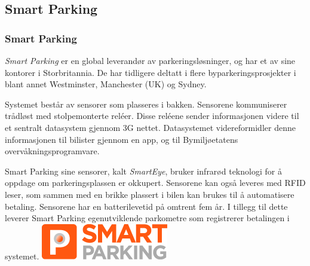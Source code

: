 \documentclass[xetex]{beamer}
\begin{document}
\begin{frame}\label{fr:smart_parking}
	\subsection{Smart Parking}
	\frametitle{\alert{Smart Parking}}
	\emph{Smart Parking} er en global leverandør av parkeringsløsninger, og har et av sine \alert{kontorer i Storbritannia}. De har tidligere deltatt i flere byparkeringsprosjekter i blant annet \alert{Westminster}, \alert{Manchester} (UK) og \alert{Sydney}.
	
	Systemet består av \alert{sensorer} som plasseres i bakken. Sensorene kommuniserer trådløst med stolpemonterte \alert{reléer}. Disse reléene sender informasjonen videre til et sentralt datasystem gjennom \alert{3G} nettet. Datasystemet videreformidler denne informasjonen til bilister gjennom en \alert{app}, og til Bymiljøetatens \alert{overvåkningsprogramvare}.
	
	Smart Parking sine sensorer, kalt \emph{SmartEye}, bruker \alert{infrarød} teknologi for å oppdage om parkeringsplassen er okkupert. Sensorene kan også leveres med \alert{RFID leser}, som sammen med en brikke plassert i bilen kan brukes til å automatisere betaling. Sensorene har en batterilevetid på omtrent \alert{fem år}. I tillegg til dette leverer Smart Parking egenutviklende \alert{parkometre} som registrerer betalingen i systemet.
	\vfill\hfill\includegraphics[scale=0.2]{grafikk/logoer/smartparking.png}
\end{frame}
\end{document}
